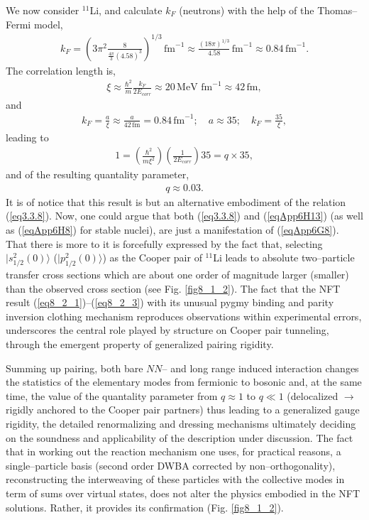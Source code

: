 \begin{subappendices}
We now consider $^{11}$Li, and calculate $k_F$ (neutrons) with the help of the Thomas--Fermi model, 
\begin{align}\label{eqApp6H9}
k_F=\left(3\pi^2\frac{8}{\frac{4\pi}{3}(4.58)^3}\right)^{1/3}\,\text{fm}^{-1}\approx\frac{(18\pi)^{1/3}}{4.58}\,\text{fm}^{-1}\approx 0.84\,\text{fm}^{-1}.
\end{align} 
The correlation length is,
\begin{align}\label{eqApp6H10}
\xi\approx\frac{\hbar^2}{m}\frac{k_F}{2E_{corr}}\approx 20\,\text{MeV fm}^{-1}\approx 42\,\text{fm},
\end{align} 
and
\begin{align}\label{eqApp6H11}
k_F=\frac{a}{\xi}\approx \frac{a}{42\,\text{fm}}=0.84\,\text{fm}^{-1};\quad a\approx 35; \quad k_F=\frac{35}{\xi},
\end{align} 
leading to
\begin{align}\label{eqApp6H12}
1=\left(\frac{\hbar^2}{m\xi^2}\right)\left(\frac{1}{2E_{corr}}\right)35=q\times 35,
\end{align}
and of the resulting quantality parameter,
\begin{align}\label{eqApp6H13}
q\approx 0.03.
\end{align}
It is of notice that this result is but an alternative embodiment of the relation (\ref{eq3.3.8}). Now, one could argue that both (\ref{eq3.3.8}) and (\ref{eqApp6H13}) (as well as (\ref{eqApp6H8}) for stable nuclei), are just a manifestation of (\ref{eqApp6G8}). That there is more to it is forcefully expressed by the fact that, selecting $|s_{1/2}^2(0)\rangle$ ($|p_{1/2}^2(0)\rangle$) as the Cooper pair of $^{11}$Li leads to absolute two--particle transfer cross sections which are about one order of magnitude larger (smaller) than the observed cross section (see Fig. \ref{fig8_1_2}). The fact that the NFT result (\ref{eq8_2_1})--(\ref{eq8_2_3}) with its unusual pygmy binding and parity inversion clothing mechanism reproduces observations within experimental errors, underscores the central role played by structure on Cooper pair tunneling, through the emergent property of generalized pairing rigidity.


Summing up pairing, both bare $NN$-- and long range induced interaction changes the statistics of the elementary modes from fermionic to bosonic and, at the same time, the value of the quantality parameter from $q\approx1$ to $q\ll 1$ (delocalized $\rightarrow$ rigidly anchored to the Cooper pair partners) thus leading to a generalized gauge rigidity, the detailed renormalizing and dressing mechanisms ultimately deciding on the soundness and applicability of the description under discussion. The fact that in working out the reaction mechanism one uses, for practical reasons, a single--particle basis (second order DWBA corrected by non--orthogonality), reconstructing the interweaving of these particles with the collective modes in term of sums over virtual states, does not alter the physics embodied in the NFT solutions. Rather, it provides its confirmation (Fig. \ref{fig8_1_2}).
 

\end{subappendices}
